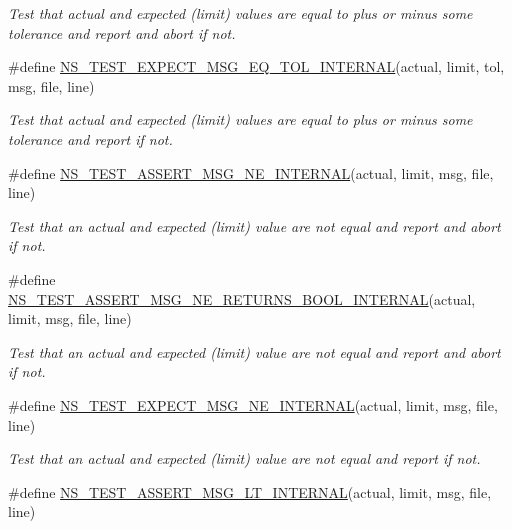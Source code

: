 \begin{DoxyCompactItemize}
\begin{DoxyCompactList}\small\item\em Test that actual and expected (limit) values are equal to plus or minus some tolerance and report and abort if not. \end{DoxyCompactList}\item 
\#define \hyperlink{group__testingimpl_ga831cf7f3b988d2759f9c1b72f0a1bd5c}{N\+S\+\_\+\+T\+E\+S\+T\+\_\+\+E\+X\+P\+E\+C\+T\+\_\+\+M\+S\+G\+\_\+\+E\+Q\+\_\+\+T\+O\+L\+\_\+\+I\+N\+T\+E\+R\+N\+AL}(actual,  limit,  tol,  msg,  file,  line)
\begin{DoxyCompactList}\small\item\em Test that actual and expected (limit) values are equal to plus or minus some tolerance and report if not. \end{DoxyCompactList}\item 
\#define \hyperlink{group__testingimpl_ga2eea3c446afc92efe1d3c3bcf3fcf2b8}{N\+S\+\_\+\+T\+E\+S\+T\+\_\+\+A\+S\+S\+E\+R\+T\+\_\+\+M\+S\+G\+\_\+\+N\+E\+\_\+\+I\+N\+T\+E\+R\+N\+AL}(actual,  limit,  msg,  file,  line)
\begin{DoxyCompactList}\small\item\em Test that an actual and expected (limit) value are not equal and report and abort if not. \end{DoxyCompactList}\item 
\#define \hyperlink{group__testingimpl_ga3c64f96a4a23d84a1212da8cbbf4b326}{N\+S\+\_\+\+T\+E\+S\+T\+\_\+\+A\+S\+S\+E\+R\+T\+\_\+\+M\+S\+G\+\_\+\+N\+E\+\_\+\+R\+E\+T\+U\+R\+N\+S\+\_\+\+B\+O\+O\+L\+\_\+\+I\+N\+T\+E\+R\+N\+AL}(actual,  limit,  msg,  file,  line)
\begin{DoxyCompactList}\small\item\em Test that an actual and expected (limit) value are not equal and report and abort if not. \end{DoxyCompactList}\item 
\#define \hyperlink{group__testingimpl_gad5555f4342248139af34e13a31ce7827}{N\+S\+\_\+\+T\+E\+S\+T\+\_\+\+E\+X\+P\+E\+C\+T\+\_\+\+M\+S\+G\+\_\+\+N\+E\+\_\+\+I\+N\+T\+E\+R\+N\+AL}(actual,  limit,  msg,  file,  line)
\begin{DoxyCompactList}\small\item\em Test that an actual and expected (limit) value are not equal and report if not. \end{DoxyCompactList}\item 
\#define \hyperlink{group__testingimpl_ga82db873e1b99e6311ba0f9dbff7c758d}{N\+S\+\_\+\+T\+E\+S\+T\+\_\+\+A\+S\+S\+E\+R\+T\+\_\+\+M\+S\+G\+\_\+\+L\+T\+\_\+\+I\+N\+T\+E\+R\+N\+AL}(actual,  limit,  msg,  file,  line)

\end{DoxyCompactItemize}
